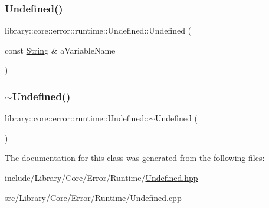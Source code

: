 \subsubsection{\texorpdfstring{Undefined()}{Undefined()}}
{\footnotesize\ttfamily library\+::core\+::error\+::runtime\+::\+Undefined\+::\+Undefined (\begin{DoxyParamCaption}\item[{const \hyperlink{classlibrary_1_1core_1_1types_1_1_string}{String} \&}]{a\+Variable\+Name }\end{DoxyParamCaption})}

\mbox{\label{classlibrary_1_1core_1_1error_1_1runtime_1_1_undefined_a9069574e62bbe7aabab0519b6052cb69}} 
\subsubsection{\texorpdfstring{$\sim$\+Undefined()}{~Undefined()}}
{\footnotesize\ttfamily library\+::core\+::error\+::runtime\+::\+Undefined\+::$\sim$\+Undefined (\begin{DoxyParamCaption}{ }\end{DoxyParamCaption})}



The documentation for this class was generated from the following files\+:\begin{DoxyCompactItemize}
\item 
include/\+Library/\+Core/\+Error/\+Runtime/\hyperlink{_undefined_8hpp}{Undefined.\+hpp}\item 
src/\+Library/\+Core/\+Error/\+Runtime/\hyperlink{_undefined_8cpp}{Undefined.\+cpp}\end{DoxyCompactItemize}
